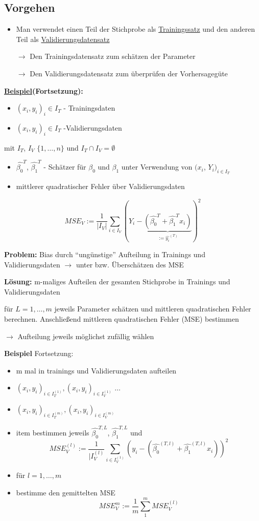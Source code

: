 \subsection{Vorgehen}
\begin{itemize}
	\item Man verwendet einen Teil der Stichprobe als \underline{Trainingssatz} und den anderen Teil als \underline{Validierungsdatensatz}
	\item[\( \rightarrow \)] Den Trainingsdatensatz zum schätzen der Parameter
	\item[\( \rightarrow \)] Den Validierungsdatensatz zum überprüfen der Vorhersagegüte
\end{itemize}

\textbf{\underline{Beispiel}(Fortsetzung):}
\begin{itemize}
	\item $(x_i, y_i)_i \in I_T$ - Trainingsdaten
	\item $(x_i,y_i)_i \in I_T$ -Validierungsdaten
\end{itemize}
mit $ I_T $, $ I_V $   $\{1,\ldots,n\}$   und $I_T \cap I_V = \emptyset$
	
\begin{itemize}
	\item $ \hat{\beta_0}^T $, $ \hat{\beta_1}^T $ - Schätzer für $\beta_0$ und  $\beta_1$ unter Verwendung von $ (x_i $, $ Y_i $$ )_{i \in I_T} $
	\item mittlerer quadratischer Fehler über Validierungsdaten
\end{itemize}

\[MSE_V := \frac{1}{|I_V|} \sum_{i \in I_V}(Y_i - \underbrace{(  \hat{\beta_0}^T +  \hat{\beta_1}^T x_i)}_{:= \hat{y_i}^{(T)}})^2\]

\textbf{Problem:} Bias durch "`ungünstige"' Aufteilung in Trainings und Validierungsdaten $\rightarrow$
unter bzw. Überschätzen des MSE

\textbf{Lösung:} m-maliges Aufteilen der gesamten Stichprobe in Trainings und Validierungsdaten

für \(L=1,\ldots, m\) jeweils Parameter schätzen und mittleren quadratischen Fehler berechnen. Anschließend mittleren quadratischen Fehler (MSE) bestimmen

$\rightarrow$ Aufteilung jeweils möglichst zufällig wählen

\textbf{Beispiel} Fortsetzung:
\begin{itemize}
	\item m mal in trainings und Validierungsdaten aufteilen
	\item $ (x_i, y_i)_{i \in I_T^{(1)}} , (x_i,y_i)_{i \in I_V^{(1)}} $ $ \ldots $
	\item $ (x_i, y_i)_{i \in I_T^{(m)} }, (x_i,y_i)_{i \in I_V^{(m)}} $
	\item item bestimmen jeweils  $\hat{\beta_0}^{T,L}$, $\hat{\beta_1}^{T,L}$ und 
	\[ MSE_V^{(l)} := \frac{1}{|I_V^{(l)}} \sum_{i \in I_V^{(1)}}(y_i - (\hat{\beta_0}^{(T,l)} + \hat{\beta_1}^{(T,l)} x_i))^2  \]
	\item für $l = 1, \ldots, m$
	\item bestimme den gemittelten MSE
	\[MSE_V^m := \frac{1}{m} \sum_{1}^{m} MSE_V^{(l)}\]
\end{itemize}

